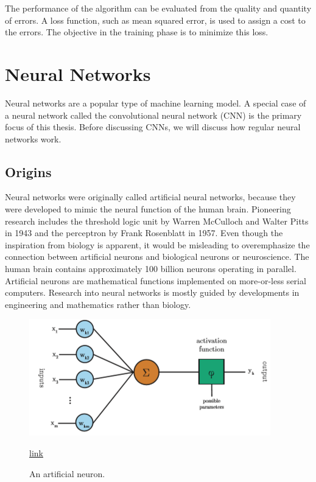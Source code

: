 The performance of the algorithm can be evaluated from the quality and quantity of errors. A loss function, such as mean squared error, is used to assign a cost to the errors. The objective in the training phase is to minimize this loss.

\section{Neural Networks}
Neural networks are a popular type of machine learning model. A special case of a neural network called the convolutional neural network (CNN) is the primary focus of this thesis. Before discussing CNNs, we will discuss how regular neural networks work.

\subsection{Origins}
Neural networks were originally called artificial neural networks, because they were developed to mimic the neural function of the human brain. Pioneering research includes the threshold logic unit by Warren McCulloch and Walter Pitts in 1943 and the perceptron by Frank Rosenblatt in 1957. Even though the inspiration from biology is apparent, it would be misleading to overemphasize the connection between artificial neurons and biological neurons or neuroscience. The human brain contains approximately 100 billion neurons operating in parallel. Artificial neurons are mathematical functions implemented on more-or-less serial computers. Research into neural networks is mostly guided by developments in engineering and mathematics rather than biology.

\begin{figure}
	\centering
	\includegraphics[width=0.7\linewidth]{img1}
	\caption{An artificial neuron.} \href{https://www.semanticscholar.org/paper/Object-detection-from-images-using-convolutional-Stenroos/a6ee78ea9c68d99d6545227fed925a721337bb16/figure/0}{link}
	\label{fig:img1}
\end{figure}


